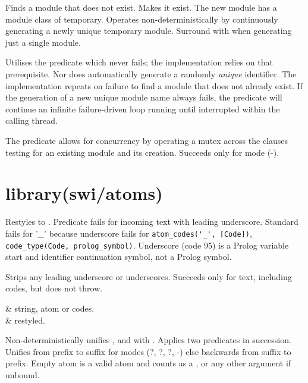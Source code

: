 \begin{description}
Finds a module that does not exist. Makes it exist. The new module
has a module class of temporary. Operates non-deterministically by
continuously generating a newly unique temporary module. Surround
with  when generating just a single module.

Utilises the  predicate which never fails; the implementation
relies on that prerequisite. Nor does  automatically generate
a randomly \textit{unique} identifier. The implementation repeats on
failure to find a module that does not already exist. If the
generation of a new unique module name always fails, the predicate
will continue an infinite failure-driven loop running until
interrupted within the calling thread.

The predicate allows for concurrency by operating a mutex across the
clauses testing for an existing module and its creation. Succeeds
only for mode (-).
\end{description}

\chapter{library(swi/atoms)}\label{sec:atoms}

\begin{description}
Restyles  to . Predicate  fails for
incoming text with leading underscore. Standard
 fails for '_' because underscore fails for
\verb$atom_codes('_', [Code])$, \verb$code_type(Code, prolog_symbol)$. Underscore
(code 95) is a Prolog variable start and identifier continuation
symbol, not a Prolog symbol.

Strips any leading underscore or underscores. Succeeds only for
text, including codes, but does not throw.

\begin{arguments}
 & string, atom or codes. \\
 & restyled. \\
\end{arguments}

Non-deterministically unifies ,  and  with .
Applies two  predicates in succession. Unifies from
prefix to suffix for modes (?, ?, ?, -) else backwards from suffix
to prefix. Empty atom is a valid atom and counts as a , 
or any other argument if unbound.
\end{description}

